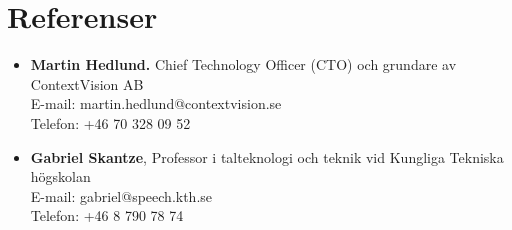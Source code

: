 \documentclass[10pt,a4paper,sans]{moderncv} %
\begin{document}
\section{Referenser}
\begin{itemize}
\item \textbf{Martin Hedlund.}
Chief Technology Officer (CTO) och grundare av ContextVision AB \\
E-mail: martin.hedlund@contextvision.se \\
Telefon: +46 70 328 09 52

\vspace{10pt}

\item \textbf{Gabriel Skantze}, Professor i talteknologi och teknik vid Kungliga Tekniska högskolan \\
E-mail: gabriel@speech.kth.se \\
Telefon: +46 8 790 78 74
\end{itemize}








\end{document}
